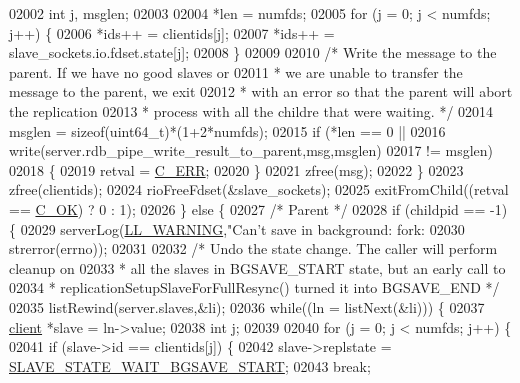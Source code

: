 \begin{DoxyCode}
{{{{{{{{{{{{{{{{{{{{{{{{{{{{{{{{{{{{{{{02002             \textcolor{keywordtype}{int} j, msglen;
02003 
02004             *len = numfds;
02005             \textcolor{keywordflow}{for} (j = 0; j < numfds; j++) \{
02006                 *ids++ = clientids[j];
02007                 *ids++ = slave\_sockets.io.fdset.state[j];
02008             \}
02009 
02010             \textcolor{comment}{/* Write the message to the parent. If we have no good slaves or}
02011 \textcolor{comment}{             * we are unable to transfer the message to the parent, we exit}
02012 \textcolor{comment}{             * with an error so that the parent will abort the replication}
02013 \textcolor{comment}{             * process with all the childre that were waiting. */}
02014             msglen = \textcolor{keyword}{sizeof}(uint64\_t)*(1+2*numfds);
02015             \textcolor{keywordflow}{if} (*len == 0 ||
02016                 write(server.rdb\_pipe\_write\_result\_to\_parent,msg,msglen)
02017                 != msglen)
02018             \{
02019                 retval = \hyperlink{server_8h_af98ac28d5f4d23d7ed5985188e6fb7d1}{C\_ERR};
02020             \}
02021             zfree(msg);
02022         \}
02023         zfree(clientids);
02024         rioFreeFdset(&slave\_sockets);
02025         exitFromChild((retval == \hyperlink{server_8h_a303769ef1065076e68731584e758d3e1}{C\_OK}) ? 0 : 1);
02026     \} \textcolor{keywordflow}{else} \{
02027         \textcolor{comment}{/* Parent */}
02028         \textcolor{keywordflow}{if} (childpid == -1) \{
02029             serverLog(\hyperlink{server_8h_a31229b9334bba7d6be2a72970967a14b}{LL\_WARNING},\textcolor{stringliteral}{"Can't save in background: fork: %
02030                 strerror(errno));
02031 
02032             \textcolor{comment}{/* Undo the state change. The caller will perform cleanup on}
02033 \textcolor{comment}{             * all the slaves in BGSAVE\_START state, but an early call to}
02034 \textcolor{comment}{             * replicationSetupSlaveForFullResync() turned it into BGSAVE\_END */}
02035             listRewind(server.slaves,&li);
02036             \textcolor{keywordflow}{while}((ln = listNext(&li))) \{
02037                 \hyperlink{structclient}{client} *slave = ln->value;
02038                 \textcolor{keywordtype}{int} j;
02039 
02040                 \textcolor{keywordflow}{for} (j = 0; j < numfds; j++) \{
02041                     \textcolor{keywordflow}{if} (slave->id == clientids[j]) \{
02042                         slave->replstate = \hyperlink{server_8h_a170ee2dd8cfefaf0d112edcc3152f8d7}{SLAVE\_STATE\_WAIT\_BGSAVE\_START};
02043                         \textcolor{keywordflow}{break};
}}}}}}}}}}}}}}}}}}}}}}}}}}}}}}}}}}}}}}}}
\end{DoxyCode}
